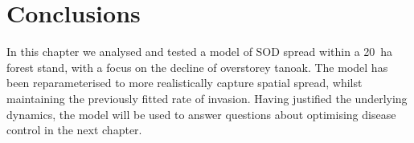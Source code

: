 \section{Conclusions\label{sec:ch5:conclusions}}

In this chapter we analysed and tested a model of SOD spread within a \SI{20}{\hectare} forest stand, with a focus on the decline of overstorey tanoak. The model has been reparameterised to more realistically capture spatial spread, whilst maintaining the previously fitted rate of invasion. Having justified the underlying dynamics, the model will be used to answer questions about optimising disease control in the next chapter.